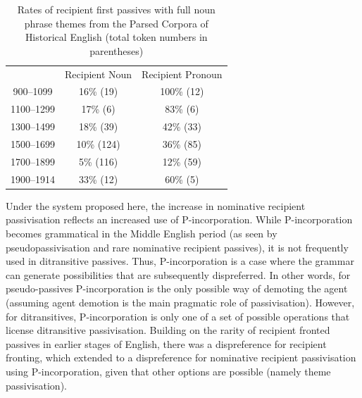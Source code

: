	\begin{table}[ht!]
		\begin{tabular}{ccc}
				&	Recipient Noun	& Recipient Pronoun \\
		900--1099	&	16\% (19)	& 100\% (12) \\
		1100--1299	&	17\% (6)	& 83\% (6) \\
		1300--1499	&	18\% (39)	& 42\% (33) \\
		1500--1699	&	10\% (124)	& 36\% (85) \\
		1700--1899	&	5\% (116)	& 12\% (59) \\
		1900--1914	&	33\% (12)	& 60\% (5) \\
		\end{tabular}
		\caption{Rates of recipient first passives with full noun phrase themes from the Parsed Corpora of Historical English (total token numbers in parentheses)}
		\label{tab:rec-pas-brit}
	\end{table}

	Under the system proposed here, the increase in nominative recipient passivisation reflects an increased use of P-incorporation. While P-incorporation becomes grammatical in the Middle English period (as seen by pseudopassivisation and rare nominative recipient passives), it is not frequently used in ditransitive passives. Thus, P-incorporation is a case where the grammar can generate possibilities that are subsequently dispreferred. In other words, for pseudo-passives P-incorporation is the only possible way of demoting the agent (assuming agent demotion is the main pragmatic role of passivisation). However, for ditransitives, P-incorporation is only one of a set of possible operations that license ditransitive passivisation. Building on the rarity of recipient fronted passives in earlier stages of English, there was a dispreference for recipient fronting, which extended to a dispreference for nominative recipient passivisation using P-incorporation, given that other options are possible (namely theme passivisation).

